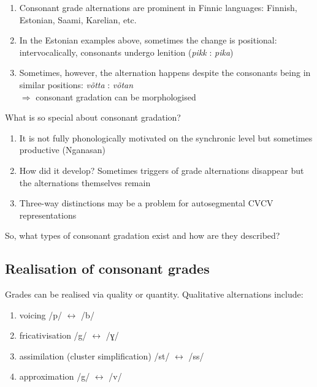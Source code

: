 \documentclass[a4paper, 12pt]{article}
\begin{document}
	\begin{enumerate}[$\gg$]
		\item Consonant grade alternations are prominent in Finnic languages: Finnish, Estonian, Saami, Karelian, etc.
		\item In the Estonian examples above, sometimes the change is positional: intervocalically, consonants undergo lenition (\emph{pikk} : \emph{pika})
		\item Sometimes, however, the alternation happens despite the consonants being in similar positions: \emph{v{\~o}tta} : \emph{v{\~o}tan}
		\\$\Rightarrow$ consonant gradation can be morphologised 
	\end{enumerate}
	What is so special about consonant gradation?
	
	\begin{enumerate}[$\gg$]
		\item It is not fully phonologically motivated on the synchronic level but sometimes productive (Nganasan)
		\item How did it develop? Sometimes triggers of grade alternations disappear but the alternations themselves remain
		\item Three-way distinctions may be a problem for autosegmental CVCV representations
	\end{enumerate}
	So, what types of consonant gradation exist and how are they described?
	
			\subsection{Realisation of consonant grades}
			
	Grades can be realised via quality or quantity. Qualitative alternations include: 
	
	\begin{enumerate}[$\gg$]
	\setlength\itemsep{0em}
		\item voicing \hfill /p/ $\leftrightarrow$ /b/
		\item fricativisation \hfill /g/ $\leftrightarrow$ /ɣ/
		\item assimilation (cluster simplification) \hfill /st/ $\leftrightarrow$ /ss/
		\item approximation \hfill /g/ $\leftrightarrow$ /v/
	\end{enumerate}
	
\end{document}
